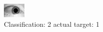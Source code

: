 \begin{figure}[h!]
\begin{center}
\includegraphics[width=0.60\columnwidth]{figures/ID1525_class_2_target_1.png}
\end{center}
\caption{ Classification: 2 actual target: 1}
\label{fig:ID1525_class_2_target_1}
\end{figure}
